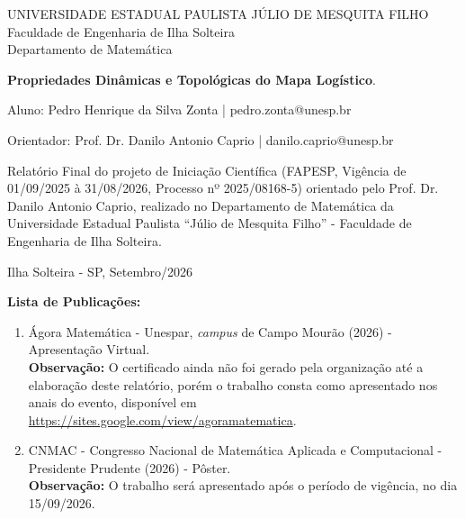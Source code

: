 \documentclass[12pt]{report}
\begin{document}
 
	
	\thispagestyle{empty}
	\begin{center}UNIVERSIDADE ESTADUAL PAULISTA JÚLIO DE MESQUITA
		FILHO\\
		Faculdade de Engenharia de Ilha Solteira\\
		Departamento de Matemática 
	\end{center}
		
	\vspace*{4cm} 
	\begin{center} 
		{\LARGE \textbf{Propriedades Dinâmicas e Topológicas do Mapa Logístico}}. 
	\end{center} 
	\vspace*{2cm}
	\begin{center}
		{\large Aluno: Pedro Henrique da Silva Zonta | pedro.zonta@unesp.br}
	\end{center} 
	\begin{center}
		{\large Orientador: Prof. Dr. Danilo Antonio Caprio | danilo.caprio@unesp.br }
	\end{center} 
	\vspace*{2cm}
	\begin{flushright}
		\begin{minipage}{13cm}
			Relatório Final do projeto de Iniciação Científica (FAPESP, Vigência de 01/09/2025 à 31/08/2026, Processo nº 2025/08168-5) orientado
			pelo Prof. Dr. Danilo Antonio Caprio, realizado no Departamento de Matemática
			da  Universidade Estadual Paulista ``Júlio de Mesquita Filho'' - Faculdade de Engenharia
			de Ilha Solteira.
		\end{minipage}
	\end{flushright}
	\vspace*{3cm} 
	\begin{center} Ilha Solteira - SP, Setembro/2026 \end{center}
		
	\newpage
	\noindent\textbf{Lista de Publicações:}
	\begin{enumerate}
		\item Ágora Matemática - Unespar, \textit{campus} de Campo Mourão (2026) - Apresentação Virtual.\\
		\textbf{\color{red}Observação:} O certificado ainda não foi gerado pela organização até a elaboração deste relatório, porém o trabalho consta como apresentado nos anais do evento, disponível em \url{https://sites.google.com/view/agoramatematica}.
		
		\item CNMAC - Congresso Nacional de Matemática Aplicada e Computacional - Presidente Prudente (2026) - Pôster.\\
		\textbf{\color{red}Observação:} O trabalho será apresentado após o período de vigência, no dia 15/09/2026.\\
	\end{enumerate}
	
\end{document}
